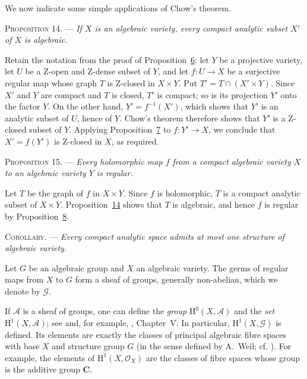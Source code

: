 We now indicate some simple applications of Chow's theorem.

\textsc{Proposition 14}. --- \emph{If $X$ is an
algebraic variety, every compact analytic subset $X'$ of $X$ is algebraic.}

Retain the notation from the proof of Proposition~\hyperref[gaga:prop:6]{6}:
let $Y$ be a projective variety, let $U$ be a Z-open and Z-dense subset of
$Y$, and let $f:U\to X$ be a surjective regular map whose graph $T$ is
Z-closed in $X\times Y$. Put $T'=T\cap(X'\times Y)$. Since $X'$ and $Y$ are
compact and $T$ is closed, $T'$ is compact; so is its projection $Y'$ onto
the factor $Y$. On the other hand, $Y'=f^{-1}(X')$, which shows that $Y'$ is
an analytic subset of $U$, hence of $Y$. Chow's theorem therefore shows that
$Y'$ is a Z-closed subset of $Y$. Applying
Proposition~\hyperref[gaga:prop:7]{7} to $f:Y'\to X$, we conclude that
$X'=f(Y')$ is Z-closed in $X$, as required.

\textsc{Proposition 15}. --- \emph{Every holomorphic
map $f$ from a compact algebraic variety $X$ to an algebraic variety $Y$ is
regular.}

Let $T$ be the graph of $f$ in $X\times Y$. Since $f$ is holomorphic, $T$ is
a compact analytic subset of $X\times Y$. Proposition~\hyperref[gaga:prop:14]{14}
shows that $T$ is algebraic, and hence $f$ is regular by
Proposition~\hyperref[gaga:prop:8]{8}.

\textsc{Corollary}. --- \emph{Every compact
analytic space admits at most one structure of algebraic variety.}


Let $G$ be an algebraic group and $X$ an algebraic variety. The germs of
regular maps from $X$ to $G$ form a sheaf of groups, generally non-abelian,
which we denote by $\mathcal{G}$.

If $\mathcal{A}$ is a sheaf of groups, one can define the \emph{group}
$\mathrm{H}^0(X,\mathcal{A})$ and the \emph{set}
$\mathrm{H}^1(X,\mathcal{A})$; see  and, for example, , Chapter~V. In
particular, $\mathrm{H}^1(X,\mathcal{G})$ is defined. Its elements are exactly
the classes of principal algebraic fibre spaces with base $X$ and structure
group $G$ (in the sense defined by A.~Weil; cf. ). For example, the
elements of $\mathrm{H}^1(X,\mathcal{O}_X)$ are the classes of fibre spaces
whose group is the additive group $\mathbf{C}$.

